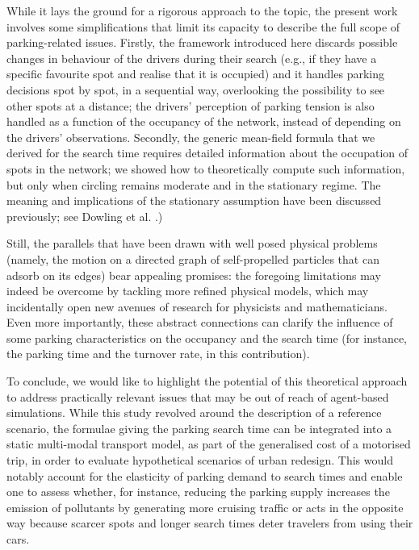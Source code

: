 \documentclass[trsc,reprint]{informs3}
\newcommand{\AN}[1]{#1}
\begin{document}
While it lays the ground for a rigorous approach to the topic,
the present work involves some simplifications that limit its capacity to describe the full scope of parking-related issues. Firstly, the framework introduced here discards possible changes in behaviour of the drivers during their search (e.g., if they have a specific favourite spot and realise that it is occupied) and it handles parking decisions spot by spot, in a sequential way, overlooking the possibility to see other spots at a distance; the drivers' perception of parking tension is also handled as a function of the occupancy of the network, instead of depending on the drivers' observations. 
Secondly, the generic mean-field formula that we derived for the search time requires detailed information about the occupation of spots in the network; we showed how to theoretically compute such information, but only 
\AN{when circling remains moderate} and in the stationary regime. 
\AN{The meaning and implications of the stationary assumption have been discussed previously; see Dowling et al. \cite{dowling2019modeling}.)}


Still, the parallels that have been drawn with well posed physical problems (namely, the motion on a directed graph of self-propelled particles that can adsorb on its edges) bear appealing promises: the foregoing limitations may indeed be overcome by tackling more refined physical models, which may incidentally open new avenues of research for physicists and mathematicians. Even more importantly, these abstract connections can clarify the influence of some parking 
characteristics on the occupancy and the search time (for instance, the parking time and the turnover rate, in this contribution).



To conclude, we would like to highlight the potential of this theoretical approach
to address practically relevant issues that may be out of reach of agent-based simulations.
While this study revolved around the description of a reference scenario, the formulae giving the parking search time
can be integrated into a static multi-modal transport model, as part of the generalised cost of a motorised trip, in order to evaluate hypothetical scenarios of urban redesign.
This would notably account for the elasticity of parking demand to search times and enable one to assess whether, for instance, reducing the parking supply increases the emission of pollutants by generating more cruising traffic or acts in the opposite way because scarcer spots and longer search times deter travelers from using their cars.
\end{document}
